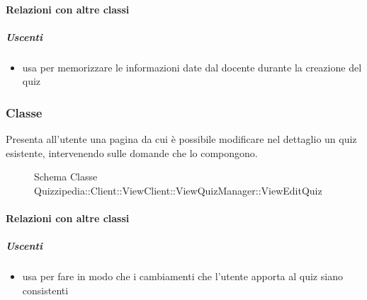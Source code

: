 \paragraph{Relazioni con altre classi}
\subparagraph{Uscenti}
\begin{itemize}
\item usa  per memorizzare le informazioni date dal docente durante la creazione del quiz
\end{itemize}
\subsubsection{Classe }
Presenta all'utente una pagina da cui è possibile modificare nel dettaglio un quiz esistente, intervenendo sulle domande che lo compongono.
\begin{figure}[H]
\centering
\noindent{}
\caption[Schema Classe ViewEditQuiz]{Schema Classe Quizzipedia::Client::ViewClient::ViewQuizManager::ViewEditQuiz}
\end{figure}
\paragraph{Relazioni con altre classi}
\subparagraph{Uscenti}
\begin{itemize}
\item usa  per fare in modo che i cambiamenti che l'utente apporta al quiz siano consistenti
\end{itemize}
